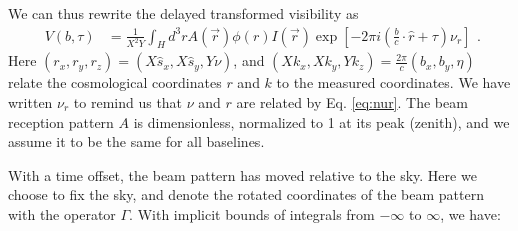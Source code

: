 \documentclass[preprint2,numberedappendix,tighten,twocolappendix]{aastex6}  %
\renewcommand\[{\begin{equation}}
\renewcommand\]{\end{equation}}
\begin{document}
We can thus rewrite the delayed transformed visibility as 
\small
\[
\begin{aligned}V(b,\tau) & =\frac{1}{X^{2}Y}\int_{H}d^{3}rA(\vec{r})\phi(r)I(\vec{r})\exp\left[-2\pi i\left(\frac{b}{c}\cdot\hat{r}+\tau\right)\nu_{r}\right]\end{aligned}.
\]
\normalsize
Here $(r_{x},r_{y},r_{z})=(X\hat{s}_{x},X\hat{s}_{y},Y\nu)$, and
$(Xk_{x},Xk_{y},Yk_{z})=\frac{2\pi}{c}(b_{x},b_{y},\eta)$ relate
the cosmological coordinates $r$ and $k$ to the measured coordinates.
We have written $\nu_{r}$ to remind us that $\nu$ and $r$ are related
by Eq. \eqref{eq:nur}. The beam reception pattern $A$ is dimensionless,
normalized to 1 at its peak (zenith), and we assume it to be the same
for all baselines. 

With a time offset, the beam pattern has moved relative to the sky.
Here we choose to fix the sky, and denote the rotated coordinates
of the beam pattern with the operator $\Gamma$. With implicit bounds
of integrals from $-\infty$ to $\infty$, we have:
\end{document}
